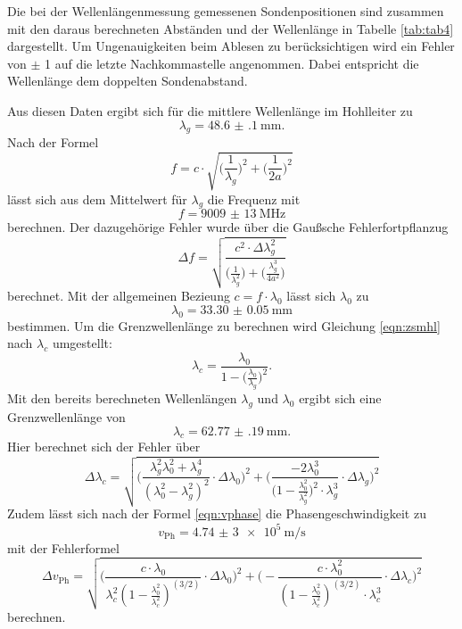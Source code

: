Die bei der Wellenlängenmessung gemessenen Sondenpositionen sind zusammen mit den daraus berechneten Abständen
und der Wellenlänge in Tabelle \ref{tab:tab4} dargestellt. Um Ungenauigkeiten beim Ablesen zu berücksichtigen wird ein
Fehler von $\pm$ 1 auf die letzte Nachkommastelle angenommen. Dabei entspricht die Wellenlänge dem doppelten
Sondenabstand.

Aus diesen Daten ergibt sich für die mittlere Wellenlänge im Hohlleiter zu
\begin{equation}
  \lambda_g = \SI{48.6(1)}{\mm}.
\end{equation}
Nach der Formel
\begin{equation}
  f=c\cdot\sqrt{\Big(\frac{1}{\lambda_g}\Big)^2 + \Big(\frac{1}{2a}\Big)^2}
\end{equation}
lässt sich aus dem Mittelwert für $\lambda_g$ die Frequenz mit
\begin{equation}
  f=\SI{9009(13)}{\MHz}
\end{equation}
berechnen. Der dazugehörige Fehler wurde über die Gaußsche Fehlerfortpflanzug
\begin{equation}
  \Delta f=\sqrt{\frac{c^2\cdot\Delta \lambda^2_g}{\Big(\frac{1}{\lambda^2_g}\Big)+\Big(\frac{\lambda^3_g}{4a^2}\Big)}}
\end{equation}
berechnet.
Mit der allgemeinen Bezieung $c=f\cdot\lambda_0$ lässt sich $\lambda_0$ zu
\begin{equation}
  \lambda_0=\SI{33.30(5)}{\mm}
\end{equation}
bestimmen. Um die Grenzwellenlänge zu berechnen wird Gleichung \ref{eqn:zsmhl} nach $\lambda_c$ umgestellt:
\begin{equation}
  \lambda_c=\frac{\lambda_0}{1-\Big(\frac{\lambda_0}{\lambda_g}\Big)^2}.
\end{equation}
Mit den bereits berechneten Wellenlängen $\lambda_g$ und $\lambda_0$ ergibt sich eine Grenzwellenlänge von
\begin{equation}
  \lambda_c=\SI{62.77(19)}{\mm}.
\end{equation}
Hier berechnet sich der Fehler über
\begin{equation}
  \Delta\lambda_c=\sqrt{\Bigg(\frac{\lambda^2_g\lambda^2_0 + \lambda^4_g}{(\lambda^2_0-\lambda^2_g)^2}\cdot\Delta\lambda_0\Bigg)^2+
  \Bigg(\frac{-2\lambda^3_0}{\Big(1-\frac{\lambda^2_0}{\lambda^2_g}\Big)^2\cdot\lambda^3_g}\cdot\Delta\lambda_g\Bigg)^2}
\end{equation}
Zudem lässt sich nach der Formel \ref{eqn:vphase} die Phasengeschwindigkeit zu
\begin{equation}
  v_\text{Ph}=\SI{4,74(3)e5}{\m\per\s}
\end{equation}
mit der Fehlerformel
\begin{equation}
  \Delta v_\text{Ph}=\sqrt{\Bigg(\frac{c\cdot\lambda_0}{\lambda^2_c(1-\frac{\lambda^2_0}{\lambda^2_c})^{(3/2)}}\cdot\Delta\lambda_0\Bigg)^2
  +\Bigg(-\frac{c\cdot\lambda^2_0}{(1-\frac{\lambda^2_0}{\lambda^2_c})^{(3/2)}\cdot\lambda^3_c} \cdot\Delta\lambda_c\Bigg)^2}
\end{equation}
berechnen.
